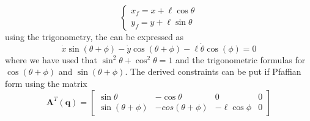 \begin{equation}
    \begin{cases}
        x_f=x+\ell\cos\theta\\
        y_f=y+\ell\sin\theta
    \end{cases}
\end{equation} 
using the trigonometry, the  can be expressed as
\begin{equation}
    \dot{x}\sin(\theta+\phi)-\dot{y}\cos(\theta+\phi)-\ell\dot{\theta}\cos(\phi)=0
\end{equation}
where we have used that $\sin^2\theta+\cos^2\theta=1$ and the trigonometric formulas for $\cos(\theta+\phi)$ and $\sin(\theta+\phi)$. The derived constraints can be put if Pfaffian form using the matrix
\begin{equation}
    \mathbf{A}^T(\mathbf{q})=\begin{bmatrix}
        \sin\theta&-\cos\theta&0&0\\
        \sin(\theta+\phi)&-cos(\theta+\phi)&-\ell\cos\phi&0
    \end{bmatrix}
\end{equation}
